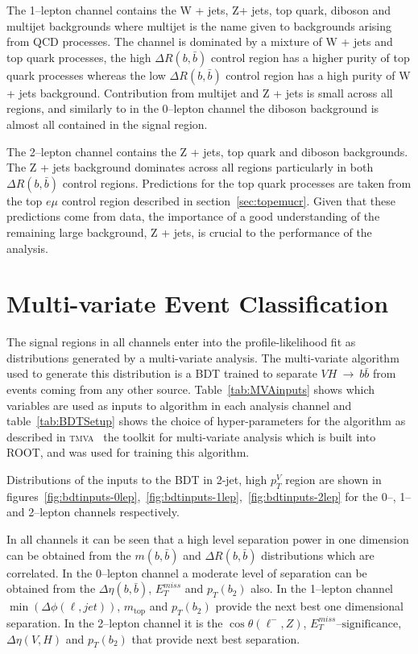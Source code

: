 

The 1--lepton channel contains the W + jets, Z+ jets, top quark, diboson and multijet
backgrounds where multijet is the name given to backgrounds arising from QCD
processes. The channel is dominated by a mixture of W + jets and top quark
processes, the high $\Delta R(b, \bar{b})$ control region has a higher purity of
top quark processes whereas the low $\Delta R(b, \bar{b})$ control region has a
high purity of W + jets background. Contribution from multijet and Z + jets is
small across all regions, and similarly to in the 0--lepton channel the diboson
background is almost all contained in the signal region.

The 2--lepton channel contains the Z + jets, top quark and diboson backgrounds.
The Z + jets background dominates across all regions particularly in both
$\Delta R(b, \bar{b})$ control regions. Predictions for the top quark processes
are taken from the top $e \mu$ control region described in
section~\ref{sec:topemucr}. Given that these predictions come from data, the
importance of a good understanding of the remaining large background, Z + jets,
is crucial to the performance of the analysis.

\section{Multi-variate Event Classification}%
\label{sec:mva}

The signal regions in all channels enter into the profile-likelihood fit as
distributions generated by a multi-variate analysis. The multi-variate algorithm
used to generate this distribution is a BDT trained to separate
$VH~\rightarrow~b\bar{b}$ from events coming from any other source.
Table~\ref{tab:MVAinputs} shows which variables are used as inputs to algorithm
in each analysis channel and table~\ref{tab:BDTSetup} shows the choice of
hyper-parameters for the algorithm as described in \textsc{tmva}~\cite{TMVA} the
toolkit for multi-variate analysis which is built into ROOT, and was used for
training this algorithm. 


Distributions of the inputs to the BDT in 2-jet, high $p_T^V$ region
are shown in
figures~\ref{fig:bdtinputs-0lep},~\ref{fig:bdtinputs-1lep},~\ref{fig:bdtinputs-2lep}
for the 0--, 1-- and 2--lepton channels respectively.

In all channels it can be seen that a high level separation power in one
dimension can be obtained from the $m(b,\bar{b})$ and $\Delta R (b, \bar{b})$
distributions which are correlated. In the 0--lepton channel a moderate level of
separation can be obtained from the $\Delta \eta(b, \bar{b})$, $E_T^{miss}$ and
$p_T(b_2)$ also. In the 1--lepton channel $\min(\Delta\phi(\ell,jet))$,
$m_{\text{top}}$ and $p_T(b_2)$ provide the next best one dimensional
separation. In the 2--lepton channel it is the $\cos{\theta(\ell^-,Z)}$,
$E_T^{miss}\text{--significance}$, $\Delta \eta(V, H)$ and $p_T(b_2)$ that
provide next best separation.
  
